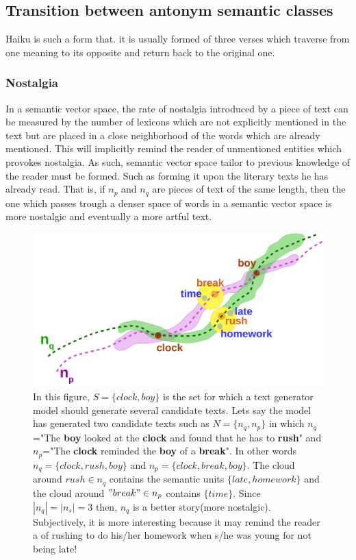 \documentclass{article}
\begin{document}
			\subsection{Transition between antonym semantic classes}
			Haiku is such a form that. it is usually formed of three verses which traverse from one meaning to its opposite and return back to the original one. 
			
			
			
			
			
			
			
			\subsubsection{Nostalgia} 
			In a semantic vector space, the rate of nostalgia introduced by a piece of text can be measured by the number of lexicons which are not explicitly mentioned in the text but are placed in a close neighborhood of the words which are already mentioned. This will implicitly remind the reader of unmentioned entities which provokes nostalgia. As such, semantic vector space tailor to previous knowledge of the reader must be formed. Such as forming it upon the literary texts he has already read. That is, if $n_p$ and $n_q$ are pieces of text of the same length, then the one which passes trough a denser space of words in a semantic vector space is more nostalgic and eventually a more artful text.  
			\begin{figure}[h!]
				\centering
				\includegraphics[width=1\textwidth]{../assets/cloud-evaluation.jpg}
				\caption{In this figure, $S=\{clock,boy\}$ is the set for which a text generator model should generate several candidate texts. Lets say the model has generated two candidate texts such as $N=\{n_q,n_p\}$ in which $n_q$="The \textbf{boy} looked at the \textbf{clock} and found that he has to \textbf{rush}" and $n_p$="The \textbf{clock} reminded the \textbf{boy} of a \textbf{break}". In other words $n_q=\{clock,rush,boy\}$ and $n_p=\{clock,break,boy\}$. The cloud around ${rush} \in n_q$ contains the semantic units $\{late,homework\}$ and the cloud around $"break" \in n_p$ contains $\{time\}$. Since $|n_q|=|n_s|=3$ then, $n_q$ is a better story(more nostalgic). Subjectively, it is more interesting because it may remind the reader a of rushing to do his/her homework when s/he was young for not being late!} 
				\label{fig:clouds-around-two-candidate-stories}
			\end{figure}
		
\end{document}
